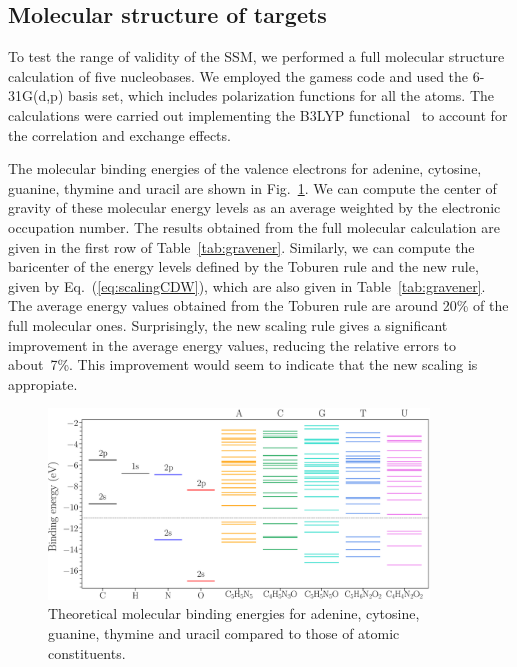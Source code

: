 \documentclass[preprint]{revtex4-2}
\begin{document}
\subsection{Molecular structure of targets}

To test the range of validity of the SSM, we performed a full molecular 
structure calculation of five nucleobases. We employed the {\sc gamess} 
code and used the 6-31G(d,p) basis set, which includes polarization 
functions for all the atoms. The calculations were carried out 
implementing the B3LYP functional~\cite{Becke1993,Stephens1994} to 
account for the correlation and exchange effects. 

The molecular binding energies of the valence electrons for adenine, 
cytosine, guanine, thymine and uracil are shown in Fig.~\ref{fig:bindener}. 
We can compute the center of gravity of these molecular energy levels as 
an average weighted by the electronic occupation number. The results 
obtained from the full molecular calculation are given in the first row
of Table~\ref{tab:gravener}. Similarly, we can compute the baricenter
of the energy levels defined by the Toburen rule and the new rule, given by
Eq.~(\ref{eq:scalingCDW}), which are also given in 
Table~\ref{tab:gravener}. The average energy values obtained from the
Toburen rule are around 20\% of the full molecular ones. Surprisingly, 
the new scaling rule gives a significant 
improvement in the average energy values, reducing the relative errors
to about~7\%. This improvement would seem to indicate that the new 
scaling is appropiate.

\begin{figure}[t!]
\centering
\includegraphics[width=0.9\textwidth]{figuras/levelsDNA.eps}
\caption{Theoretical molecular binding energies for adenine, cytosine, 
guanine, thymine and uracil compared to those of atomic constituents.}
\label{fig:bindener}
\end{figure}
\end{document}
